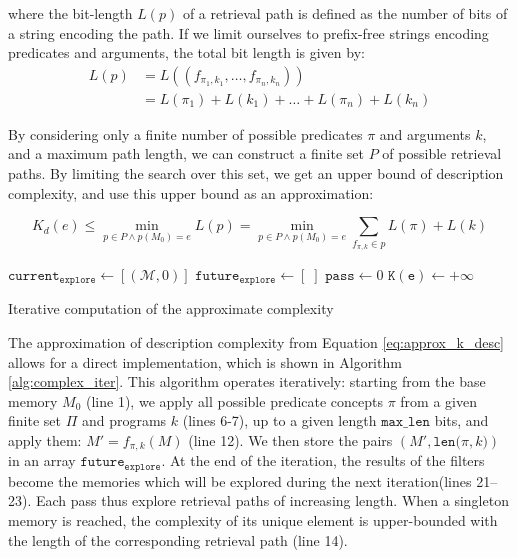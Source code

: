 \documentclass[conference]{IEEEtran}
\begin{document}
where the bit-length $L(p)$ of a retrieval path is defined as the number of bits of a string encoding the path. If we limit ourselves to prefix-free strings encoding predicates and arguments, the total bit length is given by:
\begin{align}
  \label{eq:bit_lenght_p}
  L(p) & = L((f_{\pi_1,k_1}, \dots, f_{\pi_n, k_n}))     \\
       & = L(\pi_1) + L(k_1) + \dots + L(\pi_n) + L(k_n)
\end{align}


By considering only a finite number of possible predicates $\pi$ and arguments $k$, and a maximum path length, we can construct a finite set $P$ of possible retrieval paths. By limiting the search over this set, we get an upper bound of description complexity, and use this upper bound as an approximation:

\begin{equation}
\label{eq:approx_k_desc}
K_d(e) \leq \min_{p \in P \land p(M_0) = e} L(p) = \min_{p \in P \land p(M_0)=e} \sum_{f_{\pi, k} \in p} L(\pi) + L(k)
\end{equation}

\begin{algorithm}
  $\mathtt{current_{explore}} \leftarrow [(\mathcal{M}, 0)]$ \;
  $\mathtt{future_{explore} \leftarrow} [\;]$ \;
  $\mathtt{pass} \leftarrow 0$ \;
  $\mathtt{K(e)} \leftarrow +\infty$ \;
  \caption{Iterative computation of the approximate complexity}
  \label{alg:complex_iter}
\end{algorithm}

The approximation of description complexity from Equation \ref{eq:approx_k_desc} allows for
a direct implementation, which is shown in Algorithm \ref{alg:complex_iter}. This
algorithm operates iteratively: starting from the base memory $M_0$
(line 1), we apply all possible predicate concepts $\pi$ from a given finite set
$\Pi$ and programs $k$ (lines 6-7), up to a given length $\mathtt
{max\_len}$ bits, and apply them: $M' = f_{\pi, k}(M)$ (line 12). We then store
the pairs $(M', \mathtt{len(}\pi, k\mathtt{)})$ in an array $\mathtt{future_
{explore}}$. At the end of the iteration, the results of the filters become the
memories which will be explored during the next iteration(lines 21--23). Each
pass thus explore retrieval paths of increasing length. When a singleton memory
is reached, the complexity of its unique element is upper-bounded with the
length of the corresponding retrieval path (line 14).
\end{document}
